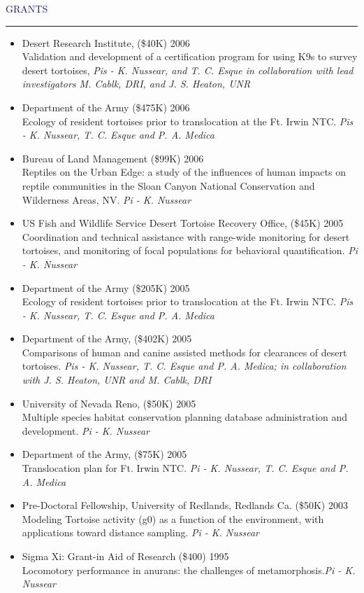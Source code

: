 \documentclass{resume} %
\renewenvironment{rSection}[1]{
\sectionskip
\textcolor{MidnightBlue}{\MakeUppercase{#1}}
\sectionlineskip
\hrule
\begin{list}{}{
\setlength{\leftmargin}{1.5em}
}
\item[]
}{
\end{list}
}
\begin{document}
\begin{rSection}{Grants}{}
\begin{itemize}
\item Desert Research Institute, (\$40K) \hfill 2006 \\ 
Validation and development of a certification program for using K9s to survey desert tortoises, \textit{Pis - K. Nussear, and T. C. Esque in collaboration with lead investigators M. Cablk, DRI, and J. S. Heaton, UNR}
\item Department of the Army (\$475K) \hfill 2006 \\ 
Ecology of resident tortoises prior to translocation at the Ft. Irwin NTC. \textit{Pis - K. Nussear, T. C. Esque and P. A. Medica}
\item Bureau of Land Management (\$99K)  \hfill 2006 \\
Reptiles on the Urban Edge: a study of the influences of human impacts on reptile communities in the Sloan Canyon National Conservation and Wilderness Areas, NV. \textit{Pi - K. Nussear}
\item US Fish and Wildlife Service Desert Tortoise Recovery Office, (\$45K)  \hfill 2005 \\
Coordination and technical assistance with range-wide monitoring for desert tortoises, and monitoring of focal populations for behavioral quantification. \textit{Pi - K. Nussear}
\item Department of the Army (\$205K)  \hfill 2005 \\
Ecology of resident tortoises prior to translocation at the Ft. Irwin NTC. \textit{Pis - K. Nussear, T. C. Esque and P. A. Medica}
\item Department of the Army, (\$402K)  \hfill 2005 \\
Comparisons of human and canine assisted methods for clearances of desert tortoises. \textit{Pis - K. Nussear, T. C. Esque and P. A. Medica; in collaboration with J. S. Heaton, UNR and M. Cablk, DRI}
\item University of Nevada Reno, (\$50K)  \hfill 2005 \\
Multiple species habitat conservation planning database administration and development. \textit{Pi - K. Nussear}
\item Department of the Army, (\$75K)  \hfill 2005 \\
Translocation plan for Ft. Irwin NTC. \textit{Pi - K. Nussear, T. C. Esque and P. A. Medica}
\item Pre-Doctoral Fellowship, University of Redlands, Redlands Ca. (\$50K) \hfill 2003 \\ Modeling Tortoise activity (g0) as a function of the environment, with applications toward distance sampling. \textit{Pi - K. Nussear}
\item Sigma Xi: Grant-in Aid of Research (\$400) 
\hfill 1995 \\ 
Locomotory performance in anurans: the challenges of metamorphosis.\textit{Pi - K. Nussear}
\end{itemize}
\end{rSection}
\end{document}
